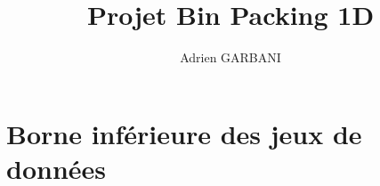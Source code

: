 \documentclass[10pt,a4paper]{article}
\author{Adrien GARBANI}
\title{Projet Bin Packing 1D}
\begin{document}
\maketitle

\section{Borne inférieure des jeux de données}
\end{document}
